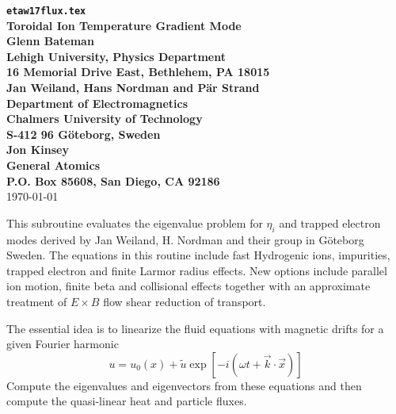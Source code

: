 
\headheight 0pt \headsep 0pt          
\topmargin 0pt  \textheight 9.0in
\oddsidemargin 0pt \textwidth 6.5in

\newcommand{\Partial}[2]{\frac{\partial #1}{\partial #2}}
\newcommand{\jacobian}{{\cal J}}



\begin{center} 
{\bf {\tt etaw17flux.tex} \\
Toroidal Ion Temperature Gradient Mode \\
\vspace{1pc}
Glenn Bateman \\
Lehigh University, Physics Department \\
16 Memorial Drive East, Bethlehem, PA 18015 \\
\vspace{1pc}
Jan Weiland, Hans Nordman and P{\"a}r Strand\\
Department of Electromagnetics \\
Chalmers University of Technology \\
S-412 96 G\"{o}teborg, Sweden \\
\vspace{1pc}
Jon Kinsey \\
General Atomics \\
P.O. Box 85608, San Diego, CA 92186} \\ 
\vspace{1pc}
\today
\end{center}
This subroutine evaluates the eigenvalue problem for $\eta_i$
and trapped electron modes derived by 
Jan Weiland, H. Nordman and their group in G\"{o}teborg Sweden.
The equations in this routine include fast Hydrogenic ions,
impurities, trapped electron and finite Larmor radius effects.
New options include parallel ion motion, finite beta and collisional effects
together with an approximate treatment of $E\times B$ flow shear reduction of 
transport.

The essential idea is to linearize the fluid equations 
with magnetic drifts for a given Fourier harmonic
\[ u = u_0(x) + \tilde{u} \exp\left[ -i (\omega t
   + \vec{k} \cdot \vec{x} ) \right] \]
Compute the eigenvalues and eigenvectors from these equations and then
compute the quasi-linear heat and particle fluxes.



